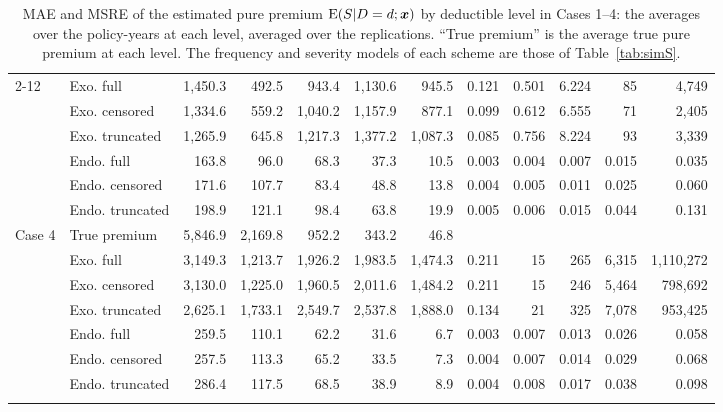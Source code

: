\documentclass[11pt]{article}
\begin{document}
\begin{table}[!ht]
{{\begin{tabular}{llrrrrrrrrrr}
\cmidrule(lr){2-12}
 & Exo. full & 1,450.3 & 492.5 & 943.4 & 1,130.6 & 945.5 & 0.121 & 0.501 & 6.224 & 85 & 4,749 \\
 & Exo. censored & 1,334.6 & 559.2 & 1,040.2 & 1,157.9 & 877.1 & 0.099 & 0.612 & 6.555 & 71 & 2,405 \\
 & Exo. truncated & 1,265.9 & 645.8 & 1,217.3 & 1,377.2 & 1,087.3 & 0.085 & 0.756 & 8.224 & 93 & 3,339 \\
 & Endo. full & 163.8 & 96.0 & 68.3 & 37.3 & 10.5 & 0.003 & 0.004 & 0.007 & 0.015 & 0.035 \\
 & Endo. censored & 171.6 & 107.7 & 83.4 & 48.8 & 13.8 & 0.004 & 0.005 & 0.011 & 0.025 & 0.060 \\
 & Endo. truncated & 198.9 & 121.1 & 98.4 & 63.8 & 19.9 & 0.005 & 0.006 & 0.015 & 0.044 & 0.131 \\
\midrule
\multirow{7}{*}{Case 4} & True premium & 5,846.9 & 2,169.8 & 952.2 & 343.2 & 46.8 & \multicolumn{5}{c}{} \\
\cmidrule(lr){2-12}
 & Exo. full & 3,149.3 & 1,213.7 & 1,926.2 & 1,983.5 & 1,474.3 & 0.211 & 15 & 265 & 6,315 & 1,110,272 \\
 & Exo. censored & 3,130.0 & 1,225.0 & 1,960.5 & 2,011.6 & 1,484.2 & 0.211 & 15 & 246 & 5,464 & 798,692 \\
 & Exo. truncated & 2,625.1 & 1,733.1 & 2,549.7 & 2,537.8 & 1,888.0 & 0.134 & 21 & 325 & 7,078 & 953,425 \\
 & Endo. full & 259.5 & 110.1 & 62.2 & 31.6 & 6.7 & 0.003 & 0.007 & 0.013 & 0.026 & 0.058 \\
 & Endo. censored & 257.5 & 113.3 & 65.2 & 33.5 & 7.3 & 0.004 & 0.007 & 0.014 & 0.029 & 0.068 \\
 & Endo. truncated & 286.4 & 117.5 & 68.5 & 38.9 & 8.9 & 0.004 & 0.008 & 0.017 & 0.038 & 0.098 \\
\hhline{============}
\end{tabular}
}
}
\caption{MAE and MSRE of the estimated pure premium ${\rm E}(S|D=d;\bm{x})$ by deductible level in Cases 1--4: the averages over the policy-years at each level, averaged over the replications. ``True premium'' is the average true pure premium at each level. The frequency and severity models of each scheme are those of Table~\ref{tab:simS}.}\label{tab:simSbylevel}
\end{table}
\end{document}
